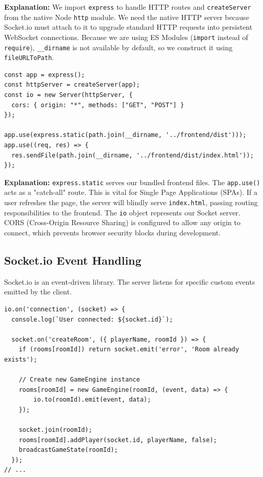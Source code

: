 \documentclass[11pt,a4paper]{article}
\begin{document}
\textbf{Explanation:} 
We import \texttt{express} to handle HTTP routes and \texttt{createServer} from the native Node \texttt{http} module. We need the native HTTP server because Socket.io must attach to it to upgrade standard HTTP requests into persistent WebSocket connections. Because we are using ES Modules (\texttt{import} instead of \texttt{require}), \texttt{\_\_dirname} is not available by default, so we construct it using \texttt{fileURLToPath}.

\begin{verbatim}
const app = express();
const httpServer = createServer(app);
const io = new Server(httpServer, {
  cors: { origin: "*", methods: ["GET", "POST"] }
});

app.use(express.static(path.join(__dirname, '../frontend/dist')));
app.use((req, res) => {
  res.sendFile(path.join(__dirname, '../frontend/dist/index.html'));
});
\end{verbatim}

\textbf{Explanation:} 
\texttt{express.static} serves our bundled frontend files. The \texttt{app.use()} acts as a "catch-all" route. This is vital for Single Page Applications (SPAs). If a user refreshes the page, the server will blindly serve \texttt{index.html}, passing routing responsibilities to the frontend.
The \texttt{io} object represents our Socket server. CORS (Cross-Origin Resource Sharing) is configured to allow any origin to connect, which prevents browser security blocks during development.

\subsection{Socket.io Event Handling}
Socket.io is an event-driven library. The server listens for specific custom events emitted by the client.

\begin{verbatim}
io.on('connection', (socket) => {
  console.log(`User connected: ${socket.id}`);

  socket.on('createRoom', ({ playerName, roomId }) => {
    if (rooms[roomId]) return socket.emit('error', 'Room already exists');
    
    // Create new GameEngine instance
    rooms[roomId] = new GameEngine(roomId, (event, data) => {
        io.to(roomId).emit(event, data);
    });
    
    socket.join(roomId);
    rooms[roomId].addPlayer(socket.id, playerName, false);
    broadcastGameState(roomId);
  });
// ... 
\end{verbatim}
\end{document}
